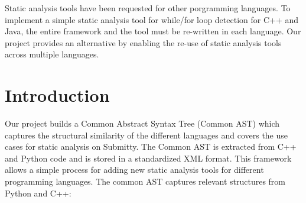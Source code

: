 \documentclass[thesis]{hmcposter}
\begin{document}
\begin{poster}
\begin{figure}
\begin{center}
\hspace{0.4in}
\end{center}
\end{figure}

Static analysis tools have been requested for other porgramming languages. To implement a simple static analysis tool for while/for loop detection for C++ and Java, the entire framework and the tool must be re-written in each language. 
Our project provides an alternative by enabling the re-use of static analysis tools across multiple languages.


%

\columnbreak

\section{Introduction}
Our project builds a Common Abstract Syntax Tree (Common AST) which captures the structural similarity of the different languages and covers the use cases for static analysis on Submitty. The Common AST is extracted from C++ and Python code and is stored in a standardized XML format. 
This framework allows a simple process for adding new static analysis tools for different programming languages.
The common AST captures relevant structures from Python and C++:


\end{poster}
\end{document}
